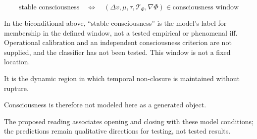 \begin{equation}
\text{stable consciousness} \quad \Leftrightarrow \quad (\Delta v, \mu, \tau, \mathcal{T}_{\Phi}, \nabla\Phi) \in \text{consciousness window}
\end{equation}

In the biconditional above, ``stable consciousness'' is the model's label for membership in the defined window, not a tested empirical or phenomenal iff. Operational calibration and an independent consciousness criterion are not supplied, and the classifier has not been tested. This window is not a fixed location.

It is the dynamic region in which temporal non-closure is maintained without rupture.

Consciousness is therefore not modeled here as a generated object.

The proposed reading associates opening and closing with these model conditions; the predictions remain qualitative directions for testing, not tested results.
